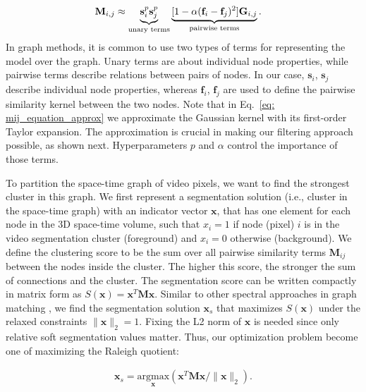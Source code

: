 \documentclass{article}
\begin{document}
\begin{equation}
    \begin{aligned}
    	 \mathbf{M}_{i,j} 
    	 & \approx \underbrace{\mathbf{s}_i^p \mathbf{s}_j^p}_{\textnormal{unary terms}} \underbrace{[1 - \alpha (\mathbf{f}_i -  \mathbf{f}_j)^2] \mathbf{G}_{i, j}}_{\textnormal{pairwise terms}}.
    \end{aligned}
	\label{eq: mij_equation_approx}
\end{equation}
In graph methods, it is common to use two types of terms for representing the model over the graph. Unary terms are about individual node properties, while pairwise terms describe relations between pairs of nodes. In our case, $\mathbf{s}_i$, $\mathbf{s}_j$ describe individual node properties, whereas $\mathbf{f}_i$, $\mathbf{f}_j$ are used to define the pairwise similarity kernel between the two nodes. Note that in Eq.~\ref{eq: mij_equation_approx} we approximate the Gaussian kernel with its first-order Taylor expansion. The approximation is crucial in making our filtering approach possible, as shown next. Hyperparameters $p$ and $\alpha$ control the importance of those terms.

To partition the space-time graph of video pixels, we want to find the strongest cluster in this graph. We first represent a segmentation solution (i.e., cluster in the space-time graph) with an indicator vector $\mathbf{x}$, that has one element for each node in the 3D space-time volume, such that $x_i=1$ if node (pixel) $i$ is in the video segmentation cluster (foreground) and  $x_i=0$ otherwise (background). We define the clustering score to be the sum over all pairwise similarity terms $\mathbf{M}_{ij}$ between the nodes inside the cluster. The higher this score, the stronger the sum of connections and the cluster. The segmentation score can be written compactly in matrix form as $S(\mathbf{x})=\mathbf{x}^T\mathbf{M}\mathbf{x}$. Similar to other spectral approaches in graph matching \cite{marius_iccv2005}, we find the segmentation solution $\mathbf{x}_s$ that maximizes $S(\mathbf{x})$ under the relaxed constraints $\|\mathbf{x}\|_2 = 1$. Fixing the L2 norm of $\mathbf{x}$ is needed since only relative soft segmentation values matter. Thus, our optimization problem become one of maximizing the Raleigh quotient:

\begin{equation}
    \begin{aligned}
        \mathbf{x}_s = \underset{\mathbf{x}}{\mathrm{argmax}}  (\mathbf{x}^T \mathbf{M} \mathbf{x } / \|\mathbf{x}\|_2).
    \end{aligned}
	\label{eq: argmax_eq}
\end{equation}
\end{document}
